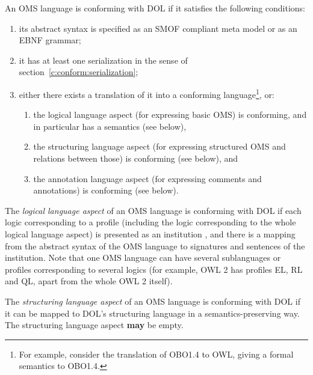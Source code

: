 \documentclass[10pt,fleqn,%
\ifpretendfinal
final%
\else
draft%
\fi,
]{scrreprt}
\newcommand*{\may}{\textbf{may}\xspace}
\begin{document}
An OMS language is conforming with DOL if it satisfies the following conditions:
\begin{enumerate}
\item its abstract syntax is specified as an SMOF compliant meta model
or as an EBNF grammar;
\item it has at least one serialization in the sense of section~\ref{c:conform:serialization};
\item either there exists a translation of it into a conforming
  language\footnote {For example, consider the translation of OBO1.4
    to OWL, giving a formal semantics to OBO1.4.}, or:
\begin{enumerate}
\item the logical language aspect (for expressing basic OMS) is conforming, and in particular has a semantics (see below),
\item  the structuring language aspect (for expressing structured OMS and relations
between those) is conforming (see below), and
\item the annotation language aspect (for expressing comments and annotations)
is conforming (see below).
\end{enumerate}
\end{enumerate}


The \emph{logical language aspect} of an OMS language
is %
conforming with DOL if each logic corresponding to a profile (including
the logic corresponding to the whole logical language aspect) is presented as an
institution \cite{GoguenBurstall92}, and there is a mapping from
the abstract syntax of the OMS language to signatures and sentences
of the institution.
Note that one OMS language can have several sublanguages or profiles 
corresponding to several logics (for example, OWL 2 has profiles EL, RL and QL, apart from the
whole OWL 2 itself).


The \emph{structuring language aspect} of an OMS language is conforming with DOL if it can be
mapped to DOL's structuring language in a semantics-preserving way. The structuring language aspect
\may be empty.
\end{document}
